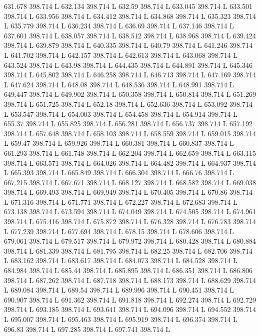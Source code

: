 631.678 398.714 L
632.134 398.714 L
632.59 398.714 L
633.045 398.714 L
633.501 398.714 L
633.956 398.714 L
634.412 398.714 L
634.868 398.714 L
635.323 398.714 L
635.779 398.714 L
636.234 398.714 L
636.69 398.714 L
637.146 398.714 L
637.601 398.714 L
638.057 398.714 L
638.512 398.714 L
638.968 398.714 L
639.424 398.714 L
639.879 398.714 L
640.335 398.714 L
640.79 398.714 L
641.246 398.714 L
641.702 398.714 L
642.157 398.714 L
642.613 398.714 L
643.068 398.714 L
643.524 398.714 L
643.98 398.714 L
644.435 398.714 L
644.891 398.714 L
645.346 398.714 L
645.802 398.714 L
646.258 398.714 L
646.713 398.714 L
647.169 398.714 L
647.624 398.714 L
648.08 398.714 L
648.536 398.714 L
648.991 398.714 L
649.447 398.714 L
649.902 398.714 L
650.358 398.714 L
650.814 398.714 L
651.269 398.714 L
651.725 398.714 L
652.18 398.714 L
652.636 398.714 L
653.092 398.714 L
653.547 398.714 L
654.003 398.714 L
654.458 398.714 L
654.914 398.714 L
655.37 398.714 L
655.825 398.714 L
656.281 398.714 L
656.737 398.714 L
657.192 398.714 L
657.648 398.714 L
658.103 398.714 L
658.559 398.714 L
659.015 398.714 L
659.47 398.714 L
659.926 398.714 L
660.381 398.714 L
660.837 398.714 L
661.293 398.714 L
661.748 398.714 L
662.204 398.714 L
662.659 398.714 L
663.115 398.714 L
663.571 398.714 L
664.026 398.714 L
664.482 398.714 L
664.937 398.714 L
665.393 398.714 L
665.849 398.714 L
666.304 398.714 L
666.76 398.714 L
667.215 398.714 L
667.671 398.714 L
668.127 398.714 L
668.582 398.714 L
669.038 398.714 L
669.493 398.714 L
669.949 398.714 L
670.405 398.714 L
670.86 398.714 L
671.316 398.714 L
671.771 398.714 L
672.227 398.714 L
672.683 398.714 L
673.138 398.714 L
673.594 398.714 L
674.049 398.714 L
674.505 398.714 L
674.961 398.714 L
675.416 398.714 L
675.872 398.714 L
676.328 398.714 L
676.783 398.714 L
677.239 398.714 L
677.694 398.714 L
678.15 398.714 L
678.606 398.714 L
679.061 398.714 L
679.517 398.714 L
679.972 398.714 L
680.428 398.714 L
680.884 398.714 L
681.339 398.714 L
681.795 398.714 L
682.25 398.714 L
682.706 398.714 L
683.162 398.714 L
683.617 398.714 L
684.073 398.714 L
684.528 398.714 L
684.984 398.714 L
685.44 398.714 L
685.895 398.714 L
686.351 398.714 L
686.806 398.714 L
687.262 398.714 L
687.718 398.714 L
688.173 398.714 L
688.629 398.714 L
689.084 398.714 L
689.54 398.714 L
689.996 398.714 L
690.451 398.714 L
690.907 398.714 L
691.362 398.714 L
691.818 398.714 L
692.274 398.714 L
692.729 398.714 L
693.185 398.714 L
693.641 398.714 L
694.096 398.714 L
694.552 398.714 L
695.007 398.714 L
695.463 398.714 L
695.919 398.714 L
696.374 398.714 L
696.83 398.714 L
697.285 398.714 L
697.741 398.714 L
